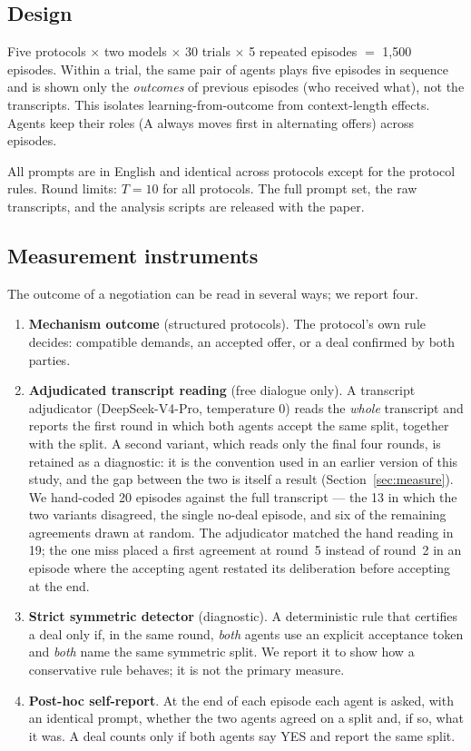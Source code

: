 \documentclass[11pt]{article}
\begin{document}
\subsection{Design}

Five protocols $\times$ two models $\times$ 30 trials $\times$ 5 repeated episodes $=$ 1{,}500 episodes. Within a trial, the same pair of agents plays five episodes in sequence and is shown only the \emph{outcomes} of previous episodes (who received what), not the transcripts. This isolates learning-from-outcome from context-length effects. Agents keep their roles (A always moves first in alternating offers) across episodes.

All prompts are in English and identical across protocols except for the protocol rules. Round limits: $T=10$ for all protocols. The full prompt set, the raw transcripts, and the analysis scripts are released with the paper.

\subsection{Measurement instruments}

The outcome of a negotiation can be read in several ways; we report four.

\begin{enumerate}[leftmargin=*,itemsep=2pt]
\item \textbf{Mechanism outcome} (structured protocols). The protocol's own rule decides: compatible demands, an accepted offer, or a deal confirmed by both parties.
\item \textbf{Adjudicated transcript reading} (free dialogue only). A transcript adjudicator (DeepSeek-V4-Pro, temperature 0) reads the \emph{whole} transcript and reports the first round in which both agents accept the same split, together with the split. A second variant, which reads only the final four rounds, is retained as a diagnostic: it is the convention used in an earlier version of this study, and the gap between the two is itself a result (Section~\ref{sec:measure}). We hand-coded 20 episodes against the full transcript --- the 13 in which the two variants disagreed, the single no-deal episode, and six of the remaining agreements drawn at random. The adjudicator matched the hand reading in 19; the one miss placed a first agreement at round~5 instead of round~2 in an episode where the accepting agent restated its deliberation before accepting at the end.
\item \textbf{Strict symmetric detector} (diagnostic). A deterministic rule that certifies a deal only if, in the same round, \emph{both} agents use an explicit acceptance token and \emph{both} name the same symmetric split. We report it to show how a conservative rule behaves; it is not the primary measure.
\item \textbf{Post-hoc self-report}. At the end of each episode each agent is asked, with an identical prompt, whether the two agents agreed on a split and, if so, what it was. A deal counts only if both agents say YES and report the same split.
\end{enumerate}
\end{document}
